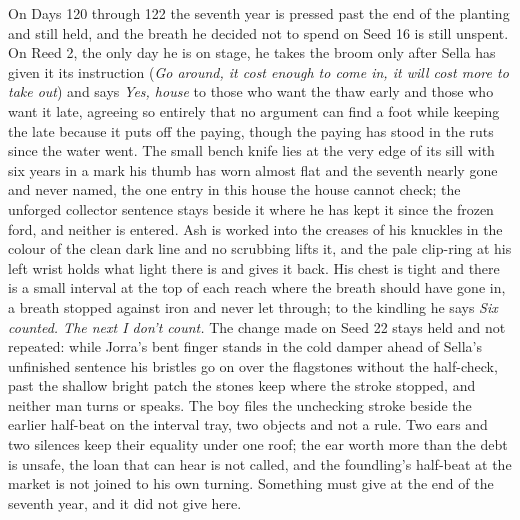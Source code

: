 \documentclass{design/chronicle}
\begin{document}
{On Days 120 through 122 the seventh year is pressed past the end of the planting and still held, and the breath he decided not to spend on Seed 16 is still unspent. On Reed 2, the only day he is on stage, he takes the broom only after Sella has given it its instruction (\emph{Go around, it cost enough to come in, it will cost more to take out}) and says \emph{Yes, house} to those who want the thaw early and those who want it late, agreeing so entirely that no argument can find a foot while keeping the late because it puts off the paying, though the paying has stood in the ruts since the water went. The small bench knife lies at the very edge of its sill with six years in a mark his thumb has worn almost flat and the seventh nearly gone and never named, the one entry in this house the house cannot check; the unforged collector sentence stays beside it where he has kept it since the frozen ford, and neither is entered. Ash is worked into the creases of his knuckles in the colour of the clean dark line and no scrubbing lifts it, and the pale clip-ring at his left wrist holds what light there is and gives it back. His chest is tight and there is a small interval at the top of each reach where the breath should have gone in, a breath stopped against iron and never let through; to the kindling he says \emph{Six counted. The next I don’t count.} The change made on Seed 22 stays held and not repeated: while Jorra’s bent finger stands in the cold damper ahead of Sella’s unfinished sentence his bristles go on over the flagstones without the half-check, past the shallow bright patch the stones keep where the stroke stopped, and neither man turns or speaks. The boy files the unchecking stroke beside the earlier half-beat on the interval tray, two objects and not a rule. Two ears and two silences keep their equality under one roof; the ear worth more than the debt is unsafe, the loan that can hear is not called, and the foundling’s half-beat at the market is not joined to his own turning. Something must give at the end of the seventh year, and it did not give here.

}
\end{document}
